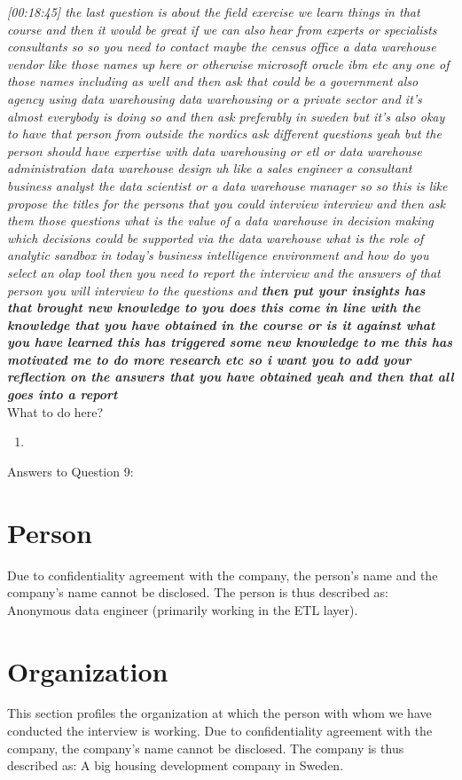 \emph{[00:18:45] the last question is about the field exercise we learn things in that course and then
it would be great if we can also hear from experts or specialists consultants so so you need to contact
maybe the census office a data warehouse vendor like those names up here or otherwise microsoft oracle ibm etc any
one of those names including as well and then ask that could be a government also agency using
data warehousing data warehousing or a private sector and it's almost everybody is doing so and then ask
preferably in sweden but it's also okay to have that person from outside the nordics ask different
questions yeah but the person should have expertise with data warehousing or etl or data warehouse
administration data warehouse design uh like a sales engineer a consultant business analyst the data
scientist or a data warehouse manager so so this is like propose the titles for the persons that you could interview
interview and then ask them those questions what is the value of a data warehouse in decision making
which decisions could be supported via the data warehouse what is the role of analytic sandbox in
today's business intelligence environment and how do you select an olap tool then you need to report
the interview and the answers of that person you will interview to the questions and \textbf{then put your
insights has that brought new knowledge to you does this come in line with the knowledge that you have
obtained in the course or is it against what you have learned this has triggered some new knowledge to me
this has motivated me to do more research etc so i want you to add your reflection on the answers that
you have obtained yeah and then that all goes into a report}}\\

What to do here?
\begin{enumerate}
    \item 
  \end{enumerate}


\newpage Answers to Question 9:
\section{Person}
Due to confidentiality agreement with the company, the person's name and the company's name cannot be disclosed. The person is thus described as:
Anonymous data engineer (primarily working in the ETL layer). 

\section{Organization}
This section profiles the organization at which the person with whom we have conducted the interview is working. 
Due to confidentiality agreement with the company, the company's name cannot be disclosed. The company is thus described as:
A big housing development company in Sweden.
